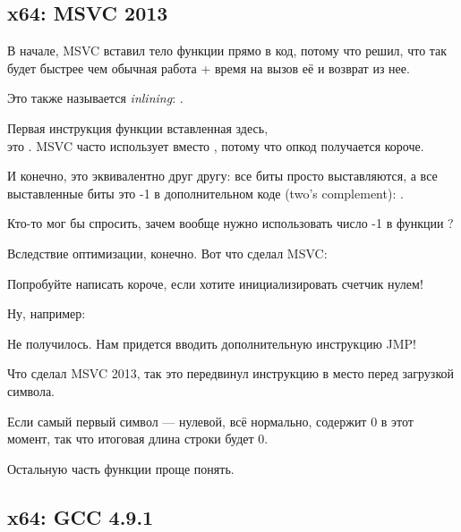 ﻿\subsection{x64: \Optimizing MSVC 2013}



В начале, MSVC вставил тело функции \strlen{} прямо в код, потому что решил, что так будет
быстрее чем обычная работа \strlen{} + время на вызов её и возврат из нее.

Это также называется \emph{inlining}: .

\label{using_OR_instead_of_MOV}
Первая инструкция функции \strlen{} вставленная здесь,\\
это . 
MSVC часто использует  вместо , потому что опкод получается короче.

И конечно, это эквивалентно друг другу: все биты просто выставляются, а все выставленные
биты это -1 в дополнительном коде (two's complement): .

Кто-то мог бы спросить, зачем вообще нужно использовать число -1 в функции \strlen{}?

Вследствие оптимизации, конечно.
Вот что сделал MSVC:



Попробуйте написать короче, если хотите инициализировать счетчик нулем!

Ну, например:



Не получилось. Нам придется вводить дополнительную инструкцию JMP!

Что сделал MSVC 2013, так это передвинул инструкцию  в место перед загрузкой символа.

Если самый первый символ --- нулевой, всё нормально, \RAX содержит 0 в этот момент, так что
итоговая длина строки будет 0.

Остальную часть функции проще понять.

\subsection{x64: \NonOptimizing GCC 4.9.1}

